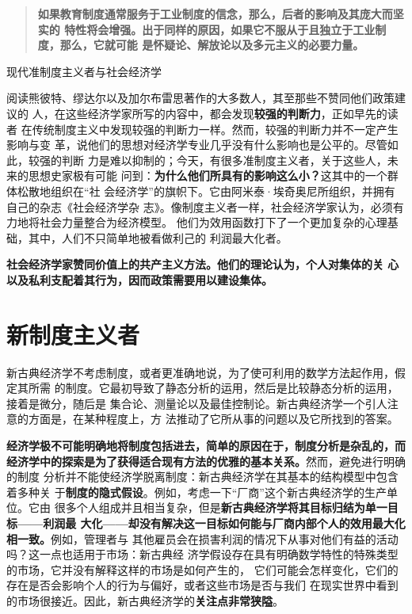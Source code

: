 \begin{quotation}
  \textbf{如果教育制度通常服务于工业制度的信念，那么，后者的影响及其庞大而坚实的
    特性将会增强。出于同样的原因，如果它不服从于且独立于工业制度，那么，它就可能
    是怀疑论、解放论以及多元主义的必要力量。}
\end{quotation}

\begin{mybox}{现代准制度主义者与社会经济学}
  \begin{multicols}{2}
    阅读熊彼特、缪达尔以及加尔布雷思著作的大多数人，其至那些不赞同他们政策建议的
    人，在这些经济学家所写的内容中，都会发现\textbf{较强的判断力}，正如早先的读者
    在传统制度主义中发现较强的判断力一样。然而，较强的判断力并不一定产生影响与变
    革，说他们的思想对经济学专业几乎没有什么影响也是公平的。尽管如此，较强的判断
    力是难以抑制的；今天，有很多准制度主义者，关于这些人，未来的思想史家极有可能
    问到：\textbf{为什么他们所具有的影响这么小？}这其中的一个群体松散地组织在“社
    会经济学”的旗帜下。它由阿米泰·埃奇奥尼所组织，并拥有自己的杂志《社会经济学杂
    志》。像制度主义者一样，社会经济学家认为，必须有力地将社会力量整合为经济模型。
    他们为效用函数打下了一个更加复杂的心理基础，其中，人们不只简单地被看做利己的
    利润最大化者。

    \textbf{社会经济学家赞同价值上的共产主义方法。他们的理论认为，个人对集体的关
      心以及私利支配着其行为，因而政策需要用以建设集体。}
  \end{multicols}

\end{mybox}

\section{新制度主义者}

新古典经济学不考虑制度，或者更准确地说，为了使可利用的数学方法起作用，假定其所需
的制度。它最初导致了静态分析的运用，然后是比较静态分析的运用，接着是微分，随后是
集合论、测量论以及最佳控制论。新古典经济学一个引人注意的方面是，在某种程度上，方
法推动了它所从事的问题以及它所找到的答案。

\textbf{经济学极不可能明确地将制度包括进去，简单的原因在于，制度分析是杂乱的，而
  经济学中的探索是为了获得适合现有方法的优雅的基本关系。}然而，避免进行明确的制度
分析并不能使经济学脱离制度：新古典经济学在其基本的结构模型中包含着多种关
于\textbf{制度的隐式假设}。例如，考虑一下“厂商”这个新古典经济学的生产单位。它由
很多个人组成并且相当复杂，但是\textbf{新古典经济学将其目标归结为单一目标——利润最
  大化——却没有解决这一目标如何能与厂商内部个人的效用最大化相一致。}例如，管理者与
其他雇员会在损害利润的情况下从事对他们有益的活动吗？这一点也适用于市场：新古典经
济学假设存在具有明确数学特性的特殊类型的市场，它并没有解释这样的市场是如何产生的，
它们可能会怎样变化，它们的存在是否会影响个人的行为与偏好，或者这些市场是否与我们
在现实世界中看到的市场很接近。因此，新古典经济学的\textbf{关注点非常狭隘}。

